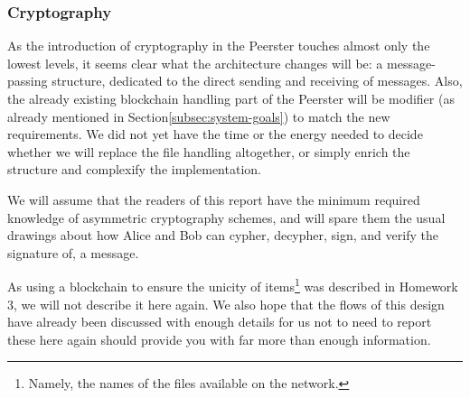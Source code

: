\documentclass[11pt, a4paper]{article}
\begin{document}




        \subsubsection{Cryptography}

            As the introduction of cryptography in the Peerster touches almost only the lowest levels, it seems clear what the architecture changes will be: a message-passing structure, dedicated to the direct sending and receiving of messages.
            Also, the already existing blockchain handling part of the Peerster will be modifier (as already mentioned in Section\ref{subsec:system-goals}) to match the new requirements.
            We did not yet have the time or the energy needed to decide whether we will replace the file handling altogether, or simply enrich the structure and complexify the implementation.

            We will assume that the readers of this report have the minimum required knowledge of asymmetric cryptography schemes, and will spare them the usual drawings about how Alice and Bob can cypher, decypher, sign, and verify the signature of, a message.

            As using a blockchain to ensure the unicity of items\footnote{Namely, the names of the files available on the network.} was described in Homework 3, we will not describe it here again.
            We also hope that the flows of this design have already been discussed with enough details for us not to need to report these here again should provide you with far more than enough information.
\end{document}
